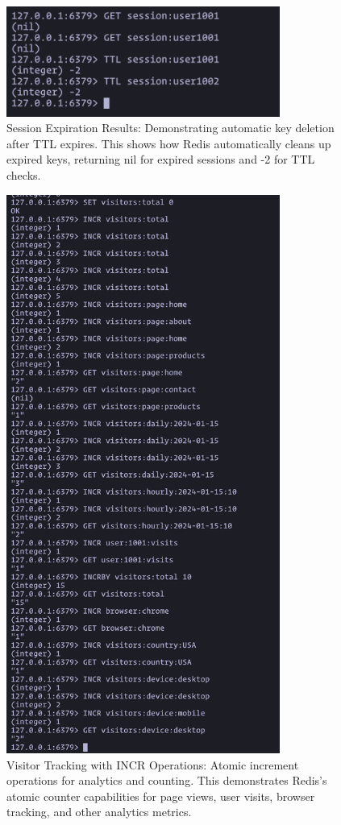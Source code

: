 \begin{figure}[H]
  \centering
  \includegraphics[width=0.8\textwidth]{task-4/screenshots/session-expiration.png}
  \caption{Session Expiration Results: Demonstrating automatic key deletion after TTL expires. This shows how Redis automatically cleans up expired keys, returning nil for expired sessions and -2 for TTL checks.}
  \label{fig:session-expiration}
\end{figure}

\begin{figure}[H]
  \centering
  \includegraphics[width=0.8\textwidth]{task-4/screenshots/visitor-tracking.png}
  \caption{Visitor Tracking with INCR Operations: Atomic increment operations for analytics and counting. This demonstrates Redis's atomic counter capabilities for page views, user visits, browser tracking, and other analytics metrics.}
  \label{fig:visitor-tracking}
\end{figure}

